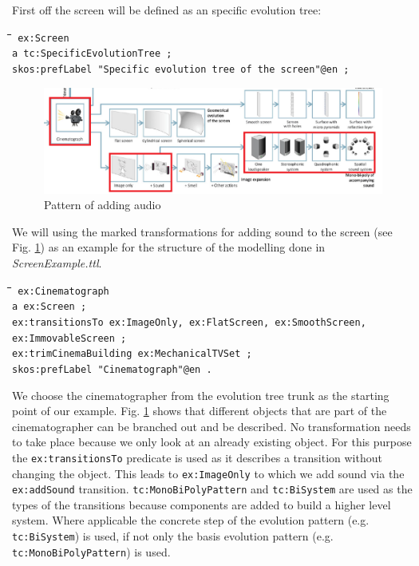 \documentclass[11pt,a4paper]{article}
\newenvironment{code}{\tt \begin{tabbing}
\hskip12pt\=\hskip12pt\=\hskip12pt\=\hskip12pt\=\hskip5cm\=\hskip5cm\=\kill}
{\end{tabbing}}
\begin{document}
First off the screen will be defined as an specific evolution tree:
\begin{code}\tt
ex:Screen \\
\> a tc:SpecificEvolutionTree ; \\
\>\> skos:prefLabel "Specific evolution tree of the screen"@en ;
\end{code}

\begin{figure}[htb]
  \centering
  \includegraphics[width=.9\linewidth]{figures/audio.png}
  \caption{\small Pattern of adding audio \cite{Shpakovsky2016}}
  \label{fig:audio}
\end{figure}

We will using the marked transformations for adding sound to the screen (see
Fig. \ref{fig:audio}) as an example for the structure of the modelling done in
\textit{ScreenExample.ttl}.

\begin{code}\tt
ex:Cinematograph \\
\> a ex:Screen ; \\
\> ex:transitionsTo ex:ImageOnly, ex:FlatScreen, ex:SmoothScreen,\\\>\>
ex:ImmovableScreen ;\\ 
\> ex:trimCinemaBuilding ex:MechanicalTVSet ;\\
\> skos:prefLabel "Cinematograph"@en .
\end{code}

We choose the cinematographer from the evolution tree trunk as the starting
point of our example. Fig. \ref{fig:audio} shows that different objects that
are part of the cinematographer can be branched out and be described. No
transformation needs to take place because we only look at an already existing
object. For this purpose the \texttt{ex:transitionsTo} predicate is used as it
describes a transition without changing the object. This leads to
\texttt{ex:ImageOnly} to which we add sound via the \texttt{ex:addSound}
transition. \texttt{tc:MonoBiPolyPattern} and \texttt{tc:BiSystem} are used as
the types of the transitions because components are added to build a higher
level system. Where applicable the concrete step of the evolution pattern
(e.g. \texttt{tc:BiSystem}) is used, if not only the basis evolution pattern
(e.g. \texttt{tc:MonoBiPolyPattern}) is used. 
\end{document}
